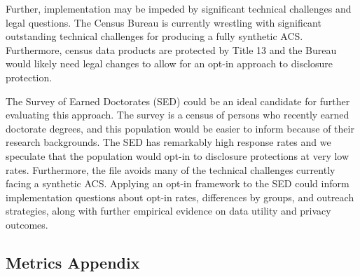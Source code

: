 \documentclass[
]{urban-formatting}
\begin{document}
Further, implementation may be impeded by significant technical
challenges and legal questions. The Census Bureau is currently wrestling
with significant outstanding technical challenges for producing a fully
synthetic ACS. Furthermore, census data products are protected by Title
13 and the Bureau would likely need legal changes to allow for an opt-in
approach to disclosure protection.

The Survey of Earned Doctorates (SED) could be an ideal candidate for
further evaluating this approach. The survey is a census of persons who
recently earned doctorate degrees, and this population would be easier
to inform because of their research backgrounds. The SED has remarkably
high response rates and we speculate that the population would opt-in to
disclosure protections at very low rates. Furthermore, the file avoids
many of the technical challenges currently facing a synthetic ACS.
Applying an opt-in framework to the SED could inform implementation
questions about opt-in rates, differences by groups, and outreach
strategies, along with further empirical evidence on data utility and
privacy outcomes.

\subsection{Metrics Appendix}











\newpage
\thispagestyle{empty}
\end{document}
